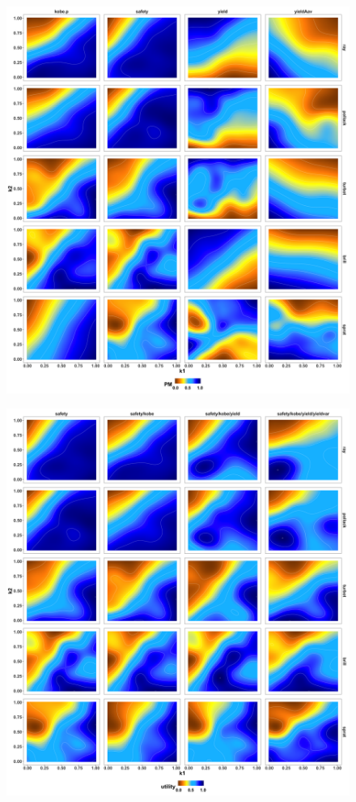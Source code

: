 \documentclass[preprint,review,12pt]{elsarticle}
\begin{document}
\begin{figure}[]\centering\includegraphics[width=5in]{fig5.png}\caption{}\label{fig:fig5}\end{figure}
\begin{figure}[]\centering\includegraphics[width=5in]{fig6.png}\caption{}\label{fig:fig6}\end{figure}
\end{document}
